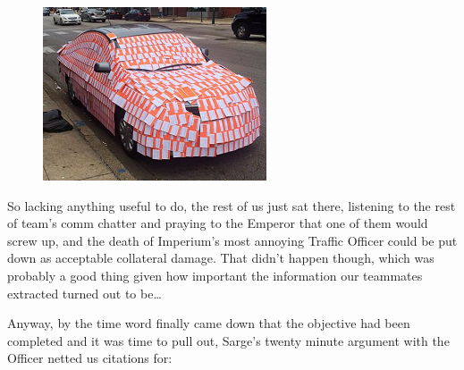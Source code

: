 \begin{figure}
	\begin{center}
		\includegraphics[width=\figwidth]{pics/17/40.png}
	\end{center}
\end{figure}
So lacking anything useful to do, the rest of us just sat there, listening to the rest of team's comm chatter and praying to the Emperor that one of them would screw up, and the death of Imperium's most annoying Traffic Officer could be put down as acceptable collateral damage. 
That didn't happen though, which was probably a good thing given how important the information our teammates extracted turned out to be… 

Anyway, by the time word finally came down that the objective had been completed and it was time to pull out, Sarge's twenty minute argument with the Officer netted us citations for:













